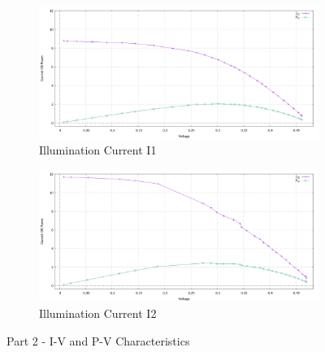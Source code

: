 \documentclass[12pt]{article}
\begin{document}
\begin{figure}[H]
	\begin{subfigure}[b]{0.6\linewidth}
	   	\includegraphics[width = \linewidth, trim = {0 0 0 0}, clip]{Part2_I1.png}
		\caption{Illumination Current I1}
	\end{subfigure}
	\begin{subfigure}[b]{0.6\linewidth}
		\includegraphics[width = \linewidth, trim = {0 0 0 0}, clip]{Part2_I2.png}
		\caption{Illumination Current I2}
	\end{subfigure} 
	\caption{Part 2 - I-V and P-V Characteristics}
\end{figure}
\end{document}
